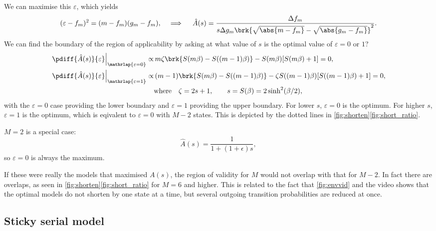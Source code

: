 \documentclass[12pt]{article}
\begin{document}
We can maximise this \wrt \(\varepsilon\), which yields
%
\begin{equation}\label{eq:shortopt}
  (\varepsilon - f_m)^2 = (m - f_m)(g_m - f_m),
  \quad \implies \quad
  \hat{A}(s) = \frac{\Delta f_{m}}
      {s \Delta g_{m} \brk{\sqrt{\abs{m - f_m}} - \sqrt{\abs{g_m - f_m}}}^2}.
\end{equation}
%
We can find the boundary of the region of applicability by asking at what value of \(s\) is the optimal value of \(\varepsilon=0\) or \(1\)?
%
\begin{equation}\label{eq:shortenvalid}
\begin{aligned}
  \left.\pdiff{\hat{A}(s)}{\varepsilon}\right|_{\mathrlap{\varepsilon=0}} \propto &\,
    m \zeta \brk{S(m\beta) - S((m-1)\beta)} - S(m\beta) [S(m\beta) + 1]
      = 0,\\
  \left.\pdiff{\hat{A}(s)}{\varepsilon}\right|_{\mathrlap{\varepsilon=1}} \propto &\,
    (m-1)\brk{S(m\beta) - S((m-1)\beta)} - \zeta S((m-1)\beta) [S((m-1)\beta) + 1]
      = 0,\\
    &\text{where}\quad
    \zeta = 2s + 1, \qquad
    s = S(\beta) = 2 \sinh^2(\beta/2),
\end{aligned}
\end{equation}
%
with the \(\varepsilon=0\) case providing the lower boundary and \(\varepsilon=1\) providing the upper boundary.
For lower \(s\), \(\varepsilon = 0\) is the optimum. 
For higher \(s\), \(\varepsilon = 1\) is the optimum, which is eqivalent to \(\varepsilon = 0\) with \(M-2\) states.
This is depicted by the dotted lines in \cref{fig:shorten}\ref{fig:short_ratio}.

\(M=2\) is a special case:
%
\begin{equation*}
  \hat{A}(s) = \frac{1}{1 + (1+\epsilon)s},
\end{equation*}
%
so \(\varepsilon=0\) is always the maximum.

If these were really the models that maximised \(A(s)\), the region of validity for \(M\) would not overlap with that for \(M-2\).
In fact there are overlaps, as seen in \cref{fig:shorten}\ref{fig:short_ratio} for \(M=6\) and higher.
This is related to the fact that \cref{fig:envvid} and the video shows that the optimal models do not shorten by one state at a time, but several outgoing transition probabilities are reduced at once.


\subsection{Sticky serial model}\label{sec:serial_sticky}
\end{document}
